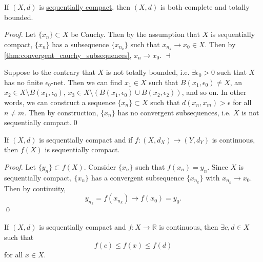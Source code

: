 \documentclass[notoc,notitlepage]{tufte-book}
\begin{document}
\begin{propo}\label{propo:sequential_compactness_implies_completeness_and_total_boundedness}
  If $(X, d)$ is \hyperref[defn:sequential_compactness]{sequentially compact}, then $(X, d)$ is both complete and totally bounded.
\end{propo}

\begin{proof}
   Let $\{ x_n \} \subset X$ be Cauchy. Then by the assumption that $X$ is sequentially compact, $\{ x_n \}$ has a subsequence $\{ x_{n_k} \}$ such that $x_{n_k} \to x_0 \in X$. Then by \cref{thm:convergent_cauchy_subsequences}, $x_n \to x_0$. $\dashv$

  \noindent
   Suppose to the contrary that $X$ is not totally bounded, i.e. $\exists \epsilon_0 > 0$ such that $X$ has no finite $\epsilon_0$-net. Then we can find $x_1 \in X$ such that $B(x_1, \epsilon_0) \neq X$, an $x_2 \in X \setminus B(x_1, \epsilon_0)$, $x_3 \in X \setminus ( B(x_1, \epsilon_0) \cup B(x_2, \epsilon_2) )$, and so on. In other words, we can construct a sequence $\{ x_n \} \subset X$ such that $d(x_n, x_m) > \epsilon$ for all $n \neq m$. Then by construction, $\{ x_n \}$ has no convergent subsequences, i.e. $X$ is not sequentially compact.\qed\
\end{proof}

\begin{thm}\label{thm:continuity_preserves_sequential_compactness}
  If $(X, d)$ is sequentially compact and if $f : (X, d_X) \to (Y, d_Y)$ is continuous, then $f(X)$ is sequentially compact.
\end{thm}

\begin{proof}
  Let $\{ y_n \} \subset f(X)$. Consider $\{ x_n \}$ such that $f(x_n) = y_n$. Since $X$ is sequentially compact, $\{ x_n \}$ has a convergent subsequence $\{ x_{n_k} \}$ with $x_{n_k} \to x_0$. Then by continuity,
  \begin{equation*}
    y_{n_k} = f(x_{n_k}) \to f(x_0) = y_0.
  \end{equation*}\qed\
\end{proof}

\begin{crly}[Extreme Value Theorem]\label{crly:extreme_value_theorem}
  If $(X, d)$ is sequentially compact and $f : X \to \mathbb{R}$ is continuous, then $\exists c, d \in X$ such that
  \begin{equation*}
    f(c) \leq f(x) \leq f(d)
  \end{equation*}
  for all $x \in X$.
\end{crly}
\end{document}
